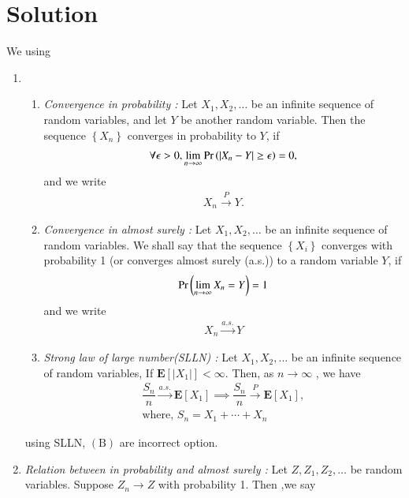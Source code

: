\documentclass[journal,12pt,twocolumn]{IEEEtran}
\begin{document}
\section{Solution}
We using
\begin{enumerate}[label=\alph*)]
\item 
\begin{enumerate}[label=(\arabic*)]
\item {\em Convergence in probability : }Let $X_{1}, X_{2}, \ldots$ be an infinite sequence of random variables, and let $Y$ be another random variable. Then the sequence $\left\{X_{n}\right\}$ converges in probability to $Y$, if
\begin{align}
\forall \epsilon>0, \lim _{n \rightarrow \infty} \Pr\left(\left|X_{n}-Y\right| \geq \epsilon\right)=0,
\end{align}
and we write 
\begin{align}
X_{n} \stackrel{P}{\rightarrow} Y.
\end{align}
\item {\em Convergence in almost surely : }Let $X_{1}, X_{2}, \ldots$ be an infinite sequence of random variables. We shall say that the sequence $\left\{X_{i}\right\}$ converges with probability 1 (or converges almost surely (a.s.)) to a random variable $Y$, if 
\begin{align}
\Pr\left(\lim _{n \rightarrow \infty} X_{n}=Y\right)=1
\end{align}
and we write
\begin{align}
X_{n} \stackrel{a . s .}{\rightarrow} Y
\end{align}
\item {\em Strong law of large number(SLLN) : }Let $X_{1}, X_{2}, \ldots$ be an infinite sequence of random variables, If $\mathbf{E}\left[\left|X_{1}\right|\right]<\infty$. Then, as $n \rightarrow \infty$ , we have 
\begin{align}
\dfrac{S_{n}}{n} \stackrel{a.s.}{\rightarrow} \mathbf{E}\left[X_{1}\right]\implies \dfrac{S_{n}}{n} \stackrel{P}{\rightarrow} \mathbf{E}\left[X_{1}\right],
\label{eq} \\
\text{where} ,\,S_n = X_1 + \cdots + X_n
\end{align}  
\end{enumerate}
using SLLN, $(\mathrm{B})$ are incorrect option.
\item {\em Relation between in probability and almost surely : }Let $Z, Z_{1}, Z_{2}, \ldots$ be random variables. Suppose $Z_{n} \rightarrow Z$ with probability 1. Then ,we say 
\begin{align}

\end{align}
\end{enumerate}
\end{document}
